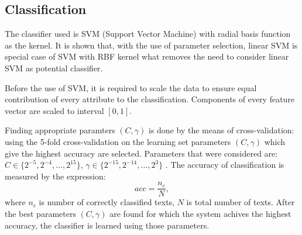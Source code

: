 \documentclass[11pt,english]{article}
\begin{document}
\begin{multicols}{2}

\section{Classification}
The classifier used is SVM (Support Vector Machine) with radial basis
function as the kernel. It is shown that, with the use of parameter selection,
linear SVM is special case of SVM with RBF kernel \citep{keerthi2003asymptotic}
what removes the need to consider linear SVM as potential classifier.

Before the use of SVM, it is required to scale the data to ensure
equal contribution of every attribute to the classification. Components of
every feature vector are scaled to interval $[0, 1]$.

Finding appropriate paramters $(C, \gamma)$ is done by the means of
cross-validation: using the 5-fold cross-validation on the
learning set parameters $(C, \gamma)$ which give the highest accuracy are
selected. Parameters that were considered are: $C \in \{2^{-5}, 2^{-4}, \ldots ,
2^{15}\}$, $\gamma \in \{2^{-15}, 2^{-14}, \ldots, 2^3\}$ \citep{CC01a}.
The accuracy of classification is measured by the expression:
\begin{equation}
acc = \frac{n_c}{N}, %
\end{equation}
where $n_c$ is number of correctly classified texts, $N$ is total number of
texts. After the best parameters  $(C, \gamma)$ are found for
which the system achives the highest accuracy, the classifier is learned using
those parameters.


\end{multicols}
\end{document}
